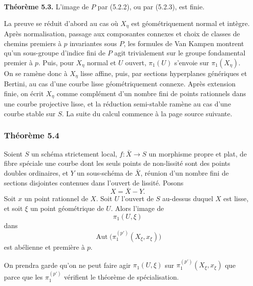 \documentclass[11pt]{article}
\providecommand{\Aut}{\operatorname{Aut}}
\providecommand{\Hom}{\operatorname{Hom}}
\begin{document}
\textbf{Théorème 5.3.} L'image de $P$ par (5.2.2), ou par (5.2.3), est finie.

La preuve se réduit d'abord au cas où $X_\eta$ est géométriquement normal et intègre. Après normalisation, passage aux composantes connexes et choix de classes de chemins premiers à $p$ invariantes sous $P$, les formules de Van Kampen montrent qu'un sous-groupe d'indice fini de $P$ agit trivialement sur le groupe fondamental premier à $p$. Puis, pour $X_\eta$ normal et $U$ ouvert, $\pi_1(U)$ s'envoie sur $\pi_1(X_\eta)$. On se ramène donc à $X_\eta$ lisse affine, puis, par sections hyperplanes génériques et Bertini, au cas d'une courbe lisse géométriquement connexe. Après extension finie, on écrit $X_\eta$ comme complément d'un nombre fini de points rationnels dans une courbe projective lisse, et la réduction semi-stable ramène au cas d'une courbe stable sur $S$. La suite du calcul commence à la page source suivante.



\providecommand{\cA}{\mathcal A}
\providecommand{\cV}{\mathcal V}
\providecommand{\cF}{\mathcal F}
\providecommand{\Hom}{\operatorname{Hom}}
\providecommand{\coker}{\operatorname{coker}}
\providecommand{\codim}{\operatorname{codim}}
\providecommand{\Coker}{\operatorname{Coker}}
\providecommand{\Picard}{\operatorname{Pic}}
\providecommand{\End}{\operatorname{End}}
\providecommand{\Prof}{\operatorname{prof}}
\providecommand{\Ima}{\operatorname{Im}}
\providecommand{\Frob}{\operatorname{Frob}}
\providecommand{\cQ}{\mathcal Q}
\providecommand{\Et}{\mathrm{et}}
\providecommand{\profp}{\widehat{\mathbb Z}^{(p')}}


\subsubsection*{Théorème 5.4}
Soient $S$ un schéma strictement local, $f:\bar X\to S$ un morphisme propre et plat, de fibre spéciale une courbe dont les seuls points de non-lissité sont des points doubles ordinaires, et $Y$ un sous-schéma de $\bar X$, réunion d'un nombre fini de sections disjointes contenues dans l'ouvert de lissité. Posons
\[
 X=\bar X-Y.
\]
Soit $x$ un point rationnel de $X$. Soit $U$ l'ouvert de $S$ au-dessus duquel $X$ est lisse, et soit $\xi$ un point géométrique de $U$. Alors l'image de
\[
 \pi_1(U,\xi)
\]
dans
\[
 \Aut\bigl(\pi_1^{(p')}(X_\xi,x_\xi)\bigr)
\]
est abélienne et première à $p$.

On prendra garde qu'on ne peut faire agir $\pi_1(U,\xi)$ sur $\pi_1^{(p')}(X_\xi,x_\xi)$ que parce que les $\pi_1^{(p')}$ vérifient le théorème de spécialisation.
\end{document}
